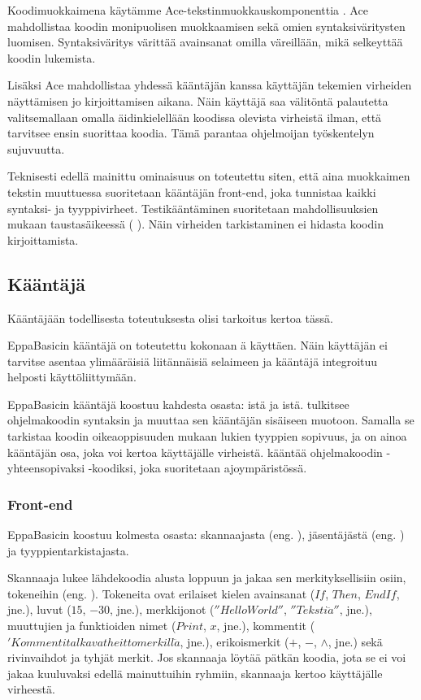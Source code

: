Koodimuokkaimena käytämme Ace-tekstinmuokkauskomponenttia \cite{ace_about}.
Ace mahdollistaa koodin monipuolisen muokkaamisen
sekä omien syntaksiväritysten luomisen.
Syntaksiväritys värittää avainsanat omilla väreillään,
mikä selkeyttää koodin lukemista.

Lisäksi Ace mahdollistaa yhdessä kääntäjän kanssa käyttäjän tekemien virheiden näyttämisen jo kirjoittamisen aikana.
Näin käyttäjä saa välitöntä palautetta valitsemallaan omalla äidinkielellään koodissa olevista virheistä ilman,
että tarvitsee ensin suorittaa koodia.
Tämä parantaa ohjelmoijan työskentelyn sujuvuutta.

Teknisesti edellä mainittu ominaisuus on toteutettu siten,
että aina muokkaimen tekstin muuttuessa suoritetaan kääntäjän front-end,
joka tunnistaa kaikki syntaksi- ja tyyppivirheet.
Testikääntäminen suoritetaan mahdollisuuksien mukaan taustasäikeessä ( \cite{w3c_web_worker}).
Näin virheiden tarkistaminen ei hidasta koodin kirjoittamista.

\subsection{Kääntäjä}
\begin{anfxnote}{}
Kääntäjään todellisesta toteutuksesta olisi tarkoitus kertoa tässä.
\end{anfxnote}

EppaBasicin kääntäjä on toteutettu kokonaan ä käyttäen.
Näin käyttäjän ei tarvitse asentaa ylimääräisiä liitännäisiä selaimeen
ja kääntäjä integroituu helposti käyttöliittymään.

EppaBasicin kääntäjä koostuu kahdesta osasta: istä ja istä.
 tulkitsee ohjelmakoodin syntaksin ja muuttaa sen kääntäjän sisäiseen muotoon.
Samalla se tarkistaa koodin oikeaoppisuuden mukaan lukien tyyppien sopivuus,
ja on ainoa kääntäjän osa, joka voi kertoa käyttäjälle virheistä.
 kääntää ohjelmakoodin -yhteensopivaksi -koodiksi,
joka suoritetaan ajoympäristössä.

\subsubsection{Front-end}
EppaBasicin  koostuu kolmesta osasta:
skannaajasta (eng. ), jäsentäjästä (eng. ) ja tyyppientarkistajasta.

Skannaaja lukee lähdekoodia alusta loppuun ja jakaa sen merkityksellisiin osiin, tokeneihin (eng. ).
Tokeneita ovat erilaiset kielen
avainsanat ($If$, $Then$, $EndIf$, jne.),
luvut ($15$, $-30$, jne.),
merkkijonot ($''HelloWorld''$, $''Teksti\ddot{a}''$, jne.),
muuttujien ja funktioiden nimet ($Print$, $x$, jne.),
kommentit ($' Kommentit alkavat heittomerkill\ddot{a}$, jne.),
erikoismerkit ($+$, $-$, $\wedge$, jne.) sekä
rivinvaihdot ja tyhjät merkit.
Jos skannaaja löytää pätkän koodia, jota se ei voi jakaa kuuluvaksi edellä mainuttuihin ryhmiin,
skannaaja kertoo käyttäjälle virheestä.

